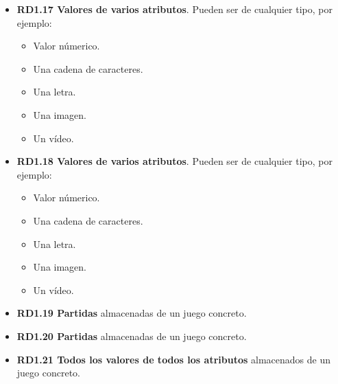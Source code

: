 \begin{itemize}
	\item \textbf{RD1.17 Valores de varios atributos}. Pueden ser de cualquier tipo, por ejemplo:
	\begin{itemize}
		\item Valor númerico.
		\item Una cadena de caracteres.
		\item Una letra.
		\item Una imagen.
		\item Un vídeo.
	\end{itemize}
	
	\item \textbf{RD1.18 Valores de varios atributos}. Pueden ser de cualquier tipo, por ejemplo:
	\begin{itemize}
		\item Valor númerico.
		\item Una cadena de caracteres.
		\item Una letra.
		\item Una imagen.
		\item Un vídeo.
	\end{itemize}
	
	\item \textbf{RD1.19 Partidas} almacenadas de un juego concreto.
	
	\item \textbf{RD1.20 Partidas} almacenadas de un juego concreto.
	
	\item \textbf{RD1.21 Todos los valores de todos los atributos} almacenados de un juego concreto.
\end{itemize}




